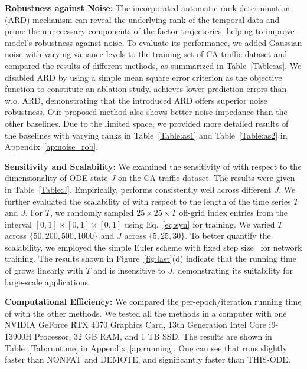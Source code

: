 \textbf{Robustness against Noise:}
The incorporated automatic rank determination (ARD) mechanism can reveal the underlying rank of the  temporal data and prune the unnecessary components of the  factor trajectories,  helping to improve model's robustness against noise. To evaluate its performance,  we  added Gaussian noise with varying  variance levels to the training set of CA traffic dataset and compared the results of different methods,  as  summarized in Table~\ref{Table:as}.
We disabled ARD by using a simple mean square error criterion as the objective function to constitute an ablation study.   \MODEL  achieves lower prediction errors than \MODEL w.o. ARD,  demonstrating that the introduced ARD offers superior noise robustness. Our proposed method also shows better noise impedance than the other baselines. Due to the limited space, we provided more detailed results of the baselines with varying ranks in Table~\ref{Table:as1} and Table~\ref{Table:as2} in Appendix~\ref{ap:noise_rob}.






\textbf{Sensitivity and Scalability:}
We  examined the sensitivity of \MODEL with respect to the dimensionality of ODE state $J$ on the CA traffic dataset. The results were given in Table~\ref{Table:J}. Empirically, \MODEL performs consistently well across different $J$.
We further evaluated the scalability of \MODEL  with respect to the  length of  the time series $T$ and   $J$. For $T$,    we randomly sampled $25 \times 25 \times T$ off-grid index entries from the interval $ [0, 1] \times [0, 1] \times [0, 1]$ using
Eq.~\eqref{eq:syn} for training. We varied $T$ across $\{50,  200,  500,  1000\}$ and $J$ across $\{5,  25,  30\}$.   To better quantify the scalability,  we  employed the simple Euler scheme with fixed step size~\citep{platen2010numerical} for network training.  The results  shown in Figure~\ref{fig:last}(d)  indicate that the running time of \MODEL  grows linearly with $T$  and  is insensitive to   $J$,  demonstrating its suitability for large-scale applications. 

\textbf{Computational Efficiency:} We  compared the per-epoch/iteration running time of  \MODEL  with the other methods. We tested all the methods in a computer with one NVIDIA GeForce RTX 4070 Graphics Card,  13th Generation Intel Core i9-13900H Processor,  32 GB RAM,  and 1 TB SSD. The results are shown in Table~\ref{Tab:runtime} in Appendix~\ref{ap:running}. One can see that \MODEL  runs slightly faster than NONFAT and DEMOTE, and significantly faster than THIS-ODE.




